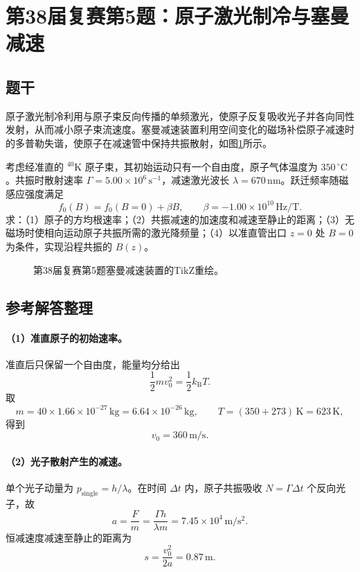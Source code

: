 \section{第38届复赛第5题：原子激光制冷与塞曼减速}

\subsection{题干}
原子激光制冷利用与原子束反向传播的单频激光，使原子反复吸收光子并各向同性发射，从而减小原子束流速度。塞曼减速装置利用空间变化的磁场补偿原子减速时的多普勒失谐，使原子在减速管中保持共振散射，如图\ref{fig:cpho38q05}所示。

考虑经准直的 ${}^{40}\mathrm K$ 原子束，其初始运动只有一个自由度，原子气体温度为 $350\,{}^\circ\mathrm C$。共振时散射速率 $\Gamma=5.00\times10^6\,\mathrm{s^{-1}}$，减速激光波长 $\lambda=670\,\mathrm{nm}$。跃迁频率随磁感应强度满足
\[
f_0(B)=f_0(B=0)+\beta B,\qquad
\beta=-1.00\times10^{10}\,\mathrm{Hz/T}.
\]
求：（1）原子的方均根速率；（2）共振减速的加速度和减速至静止的距离；（3）无磁场时使相向运动原子共振所需的激光降频量；（4）以准直管出口 $z=0$ 处 $B=0$ 为条件，实现沿程共振的 $B(z)$。
\begin{figure}[htbp]
  \centering
  
  \caption{第38届复赛第5题塞曼减速装置的TikZ重绘。}
  \label{fig:cpho38q05}
\end{figure}

\subsection{参考解答整理}
\paragraph{（1）准直原子的初始速率。}
准直后只保留一个自由度，能量均分给出
\[
\frac12mv_0^2=\frac12k_\mathrm BT.
\]
取
\[
m=40\times1.66\times10^{-27}\,\mathrm{kg}=6.64\times10^{-26}\,\mathrm{kg},
\qquad T=(350+273)\,\mathrm K=623\,\mathrm K,
\]
得到
\[
\boxed{v_0=360\,\mathrm{m/s}.}
\]

\paragraph{（2）光子散射产生的减速。}
单个光子动量为 $p_{\mathrm{single}}=h/\lambda$。在时间 $\Delta t$ 内，原子共振吸收 $N=\Gamma\Delta t$ 个反向光子，故
\[
a=\frac{F}{m}=\frac{\Gamma h}{\lambda m}
=7.45\times10^4\,\mathrm{m/s^2}.
\]
恒减速度减速至静止的距离为
\[
\boxed{s=\frac{v_0^2}{2a}=0.87\,\mathrm m.}
\]

